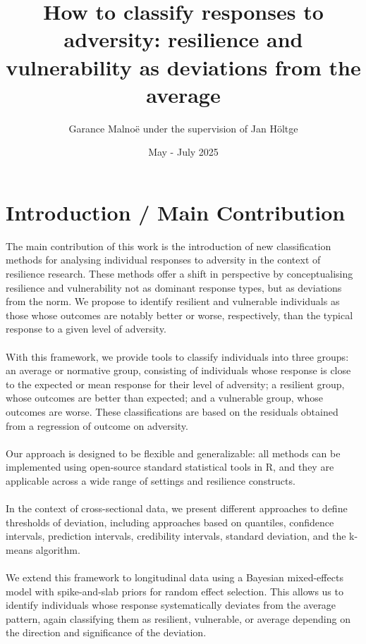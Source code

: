 \documentclass[12pt]{article}
\begin{document}
\title{How to classify responses to adversity: resilience and vulnerability as deviations from the average}
\author{Garance Malnoë under the supervision of Jan Höltge}
\date{May - July 2025}

\maketitle
\tableofcontents
\clearpage
{}
\section{Introduction / Main Contribution}

The main contribution of this work is the introduction of new classification methods for analysing individual responses to adversity in the context of resilience research. These methods offer a shift in perspective by conceptualising resilience and vulnerability not as dominant response types, but as deviations from the norm. We propose to identify resilient and vulnerable individuals as those whose outcomes are notably better or worse, respectively, than the typical response to a given level of adversity.\\
\\
With this framework, we provide tools to classify individuals into three groups: an average or normative group, consisting of individuals whose response is close to the expected or mean response for their level of adversity; a resilient group, whose outcomes are better than expected; and a vulnerable group, whose outcomes are worse. These classifications are based on the residuals obtained from a regression of outcome on adversity.\\
\\
Our approach is designed to be flexible and generalizable: all methods can be implemented using open-source standard statistical tools in R, and they are applicable across a wide range of settings and resilience constructs.\\
\\
In the context of cross-sectional data, we present different approaches to define thresholds of deviation, including approaches based on quantiles, confidence intervals, prediction intervals, credibility intervals, standard deviation, and the k-means algorithm.\\
\\
We extend this framework to longitudinal data using a Bayesian mixed-effects model with spike-and-slab priors for random effect selection. This allows us to identify individuals whose response systematically deviates from the average pattern, again classifying them as resilient, vulnerable, or average depending on the direction and significance of the deviation.\\
\end{document}
